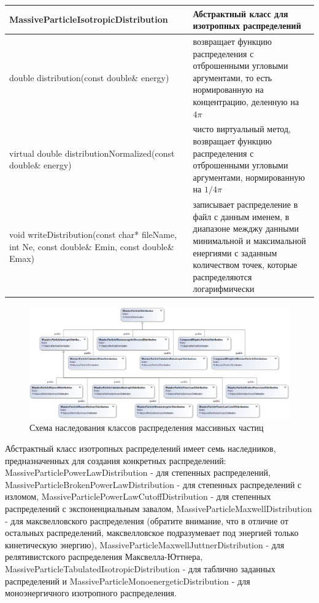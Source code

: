 \begin{small}
		\label{MassiveParticleMethods}
			\begin{xtabular}{|p{0.45\textwidth}|p{0.55\textwidth}|}
				\hline
				\textbf{MassiveParticleIsotropicDistribution} & Абстрактный класс для изотропных распределений\\
				\hline
				double distribution(const double\& energy) & возвращает функцию распределения с отброшенными угловыми аргументами, то есть нормированную на концентрацию, деленную на $4 \pi$ \\
				\hline
				virtual double distributionNormalized(const double\& energy) & чисто виртуальный метод, возвращает функцию распределения с отброшенными угловыми аргументами, нормированную на  $ 1 / 4 \pi$\\
				\hline
				void writeDistribution(const char* fileName, int Ne, const double\& Emin, const double\& Emax) & записывает распределение в файл с данным именем, в диапазоне межджу данными минимальной и максимальной енергиями с заданным количеством точек, которые распределяются логарифмически\\
				\hline
	\end{xtabular}
\end{small}

\begin{figure}[h]
	\centering
	\includegraphics[width=14.5 cm]{./fig/massiveParticleDistribution2.png} 
	\caption{Схема наследования классов распределения массивных частиц}
	\label{massiveDistribution}
\end{figure}

Абстрактный класс изотропных распределений имеет семь наследников, предназначенных для создания конкретных распределений: MassiveParticlePowerLawDistribution - для степенных распределений, MassiveParticleBrokenPowerLawDistribution - для степенных распределений с изломом, MassiveParticlePowerLawCutoffDistribution - для степенных распределений с экспоненциальным завалом, MassiveParticleMaxwellDistribution - для максвелловского распределения (обратите внимание, что в отличие от остальных распределений, максвелловское подразумевает под энергией только кинетическую энергию), MassiveParticleMaxwellJuttnerDistribution - для релятивистского распределения Максвелла-Юттнера, MassiveParticleTabulatedIsotropicDistribution - для таблично заданных распределений и MassiveParticleMonoenergeticDistribution - для моноэнергичного изотропного распределения.

